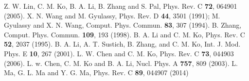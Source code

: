 \documentclass[11pt,a4paper,openany]{article}
\begin{document}
\begin{thebibliography}{88}
 Z. W. Lin, C. M. Ko, B. A. Li, B. Zhang and S. Pal, Phys. Rev. C {\bf 72},
 064901 (2005).
 X. N. Wang and M. Gyulassy, Phys. Rev. D \textbf{44}, 3501 (1991); M. Gyulassy and
X. N. Wang, Comput. Phys. Commun. \textbf{83}, 307 (1994).
 B. Zhang, Comput. Phys. Commun. \textbf{109}, 193 (1998).
 B. A. Li and C. M. Ko, Phys. Rev. C \textbf{52}, 2037 (1995).
 B. A. Li, A. T. Sustich, B. Zhang, and C. M. Ko, Int. J. Mod. Phys. E \textbf{10},
267 (2001).
 L. W. Chen and C. M. Ko, Phys. Rev. C \textbf{73}, 044903 (2006).
 L. w. Chen, C. M. Ko and B. A. Li, Nucl. Phys. A \textbf{757}, 809 (2003).
 L. Ma, G. L. Ma and Y. G. Ma, Phys. Rev. C \textbf{89}, 044907 (2014)
\end{thebibliography}
\end{document}
